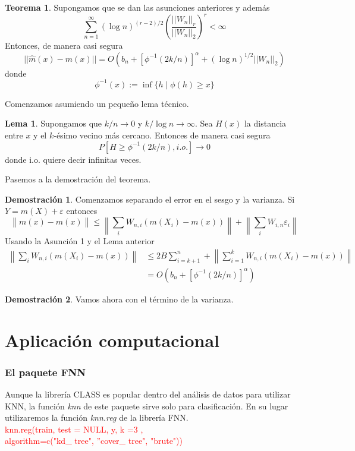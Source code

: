 \documentclass{beamer}
\theoremstyle{definition}
\newtheorem{teorema}{Teorema}
\newtheorem{lema}{Lema}
\newtheorem{dem}{Demostración}
\providecommand{\norm}[1]{\left\lVert#1\right\rVert}
\begin{document}
\begin{frame}
\begin{teorema}
Supongamos que se dan las asunciones anteriores y además
$$
\sum_{n=1}^\infty (\log n)^{(r-2)/2}\left(\frac{||W_n||_r}{||W_n||_2}\right)^r < \infty
$$
Entonces, de manera casi segura
$$
||\hat{m}(x)-m(x)|| = O(b_n + [\phi^{-1}(2k/n)]^\alpha + (\log n)^{1/2}||W_n||_2)
$$
donde
$$
\phi^{-1}(x):= \inf\{h \mid \phi(h)\geq x\}%
$$\end{teorema}
\end{frame}


\begin{frame}

Comenzamos asumiendo un pequeño lema técnico.
\begin{lema}
Supongamos que $k/n\to 0$ y $k/\log n \to \infty$. Sea $H(x)$ la distancia entre $x$ y el $k$-ésimo vecino más cercano. Entonces de manera casi segura
$$
P[H\geq \phi^{-1}(2k/n), i.o.] \to 0
$$
donde i.o. quiere decir infinitas veces.
\end{lema}

\end{frame}

\begin{frame}
Pasemos a la demostración del teorema.
\begin{dem}
Comenzamos separando el error en el sesgo y la varianza. Si $Y=m(X)+\varepsilon$ entonces
$$
\norm{m(x)-\hat{m}(x)} \leq \norm{\sum_i W_{n,i}(m(X_i)-m(x))} + \norm{\sum_i W_{i,n} \varepsilon_i}
$$
Usando la Asunción 1 y el Lema anterior
\begin{align*}
\norm{\sum_i W_{n,i}(m(X_i)-m(x))}  & \leq 2B\sum_{i=k+1}^n + \norm{\sum_{i=1}^k W_{n,i}(m(X_i)-m(x))}\\
&= O(b_n + [\phi^{-1}(2k/n)]^\alpha)
\end{align*}

\end{dem}
\end{frame}

\begin{frame}
\begin{dem}
Vamos ahora con el término de la varianza.
\end{dem}
\end{frame}
\section{Aplicación computacional}

\begin{frame}
\frametitle{El paquete FNN}
Aunque la librería CLASS es popular dentro del análisis de datos para utilizar KNN, la función \textit{knn} de este paquete sirve solo para clasificación. En su lugar utilizaremos la función \textit{knn.reg} de la librería FNN. 
\newline
\\
\textcolor{red}{knn.reg(train, test = NULL, y, k =3 , \\ \qquad algorithm=c("kd\_ tree", 
''cover\_ tree", "brute"))}
\newline
\\

\end{frame}
\end{document}
